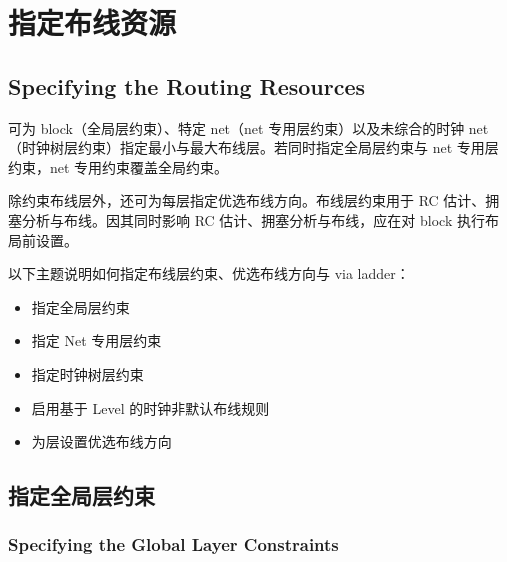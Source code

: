 \section{指定布线资源}
\subsection*{Specifying the Routing Resources}

可为 block（全局层约束）、特定 net（net 专用层约束）以及未综合的时钟 net（时钟树层约束）指定最小与最大布线层。若同时指定全局层约束与 net 专用层约束，net 专用约束覆盖全局约束。

除约束布线层外，还可为每层指定优选布线方向。布线层约束用于 RC 估计、拥塞分析与布线。因其同时影响 RC 估计、拥塞分析与布线，应在对 block 执行布局前设置。

以下主题说明如何指定布线层约束、优选布线方向与 via ladder：
\begin{itemize}
  \item 指定全局层约束
  \item 指定 Net 专用层约束
  \item 指定时钟树层约束
  \item 启用基于 Level 的时钟非默认布线规则
  \item 为层设置优选布线方向
\end{itemize}

\subsection{指定全局层约束}
\subsubsection*{Specifying the Global Layer Constraints}

